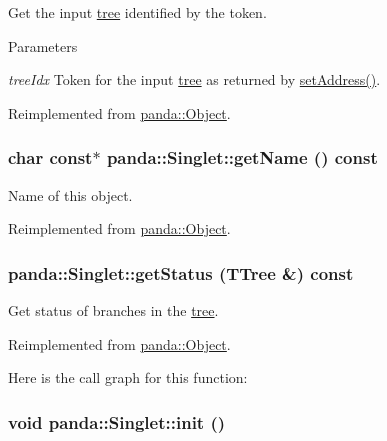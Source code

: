 Get the input \hyperlink{namespacepanda_1_1tree}{tree} identified by the token. 
\begin{DoxyParams}{Parameters}
\item[{\em treeIdx}]Token for the input \hyperlink{namespacepanda_1_1tree}{tree} as returned by \hyperlink{classpanda_1_1Singlet_ac5daab18f365a00fe5dbdc887d173e05}{setAddress()}. \end{DoxyParams}


Reimplemented from \hyperlink{classpanda_1_1Object_a69038e1ce9bc60222bb0ba7e7f933bd5}{panda::Object}.\hypertarget{classpanda_1_1Singlet_a0cadb592bf3f3c40f26cb67a406b582e}{
\subsubsection[{getName}]{\setlength{\rightskip}{0pt plus 5cm}char const$\ast$ panda::Singlet::getName () const}}
\label{classpanda_1_1Singlet_a0cadb592bf3f3c40f26cb67a406b582e}


Name of this object. 

Reimplemented from \hyperlink{classpanda_1_1Object_a670b2150de796b6fc742fa9de30cd6b1}{panda::Object}.\hypertarget{classpanda_1_1Singlet_a0d574c73f45883793b4ba0a84a14e2bd}{
\subsubsection[{getStatus}]{ panda::Singlet::getStatus (TTree \&) const}}
\label{classpanda_1_1Singlet_a0d574c73f45883793b4ba0a84a14e2bd}


Get status of branches in the \hyperlink{namespacepanda_1_1tree}{tree}. 

Reimplemented from \hyperlink{classpanda_1_1Object_ad575503e839f7aa6cc47434b3a24cb80}{panda::Object}.

Here is the call graph for this function:\hypertarget{classpanda_1_1Singlet_aef09da29df235d3cdbb2e870d1ca76cb}{
\subsubsection[{init}]{\setlength{\rightskip}{0pt plus 5cm}void panda::Singlet::init ()}}
\label{classpanda_1_1Singlet_aef09da29df235d3cdbb2e870d1ca76cb}


